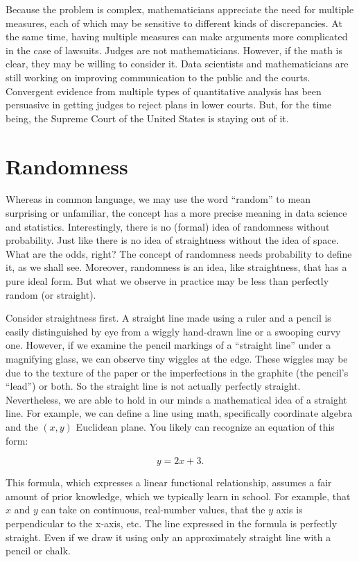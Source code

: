 \documentclass[
  openany]{book}
\begin{document}
Because the problem is complex, mathematicians appreciate the need for multiple measures, each of which may be sensitive to different kinds of discrepancies. At the same time, having multiple measures can make arguments more complicated in the case of lawsuits. Judges are not mathematicians. However, if the math is clear, they may be willing to consider it. Data scientists and mathematicians are still working on improving communication to the public and the courts. Convergent evidence from multiple types of quantitative analysis has been persuasive in getting judges to reject plans in lower courts. But, for the time being, the Supreme Court of the United States is staying out of it.

\hypertarget{appendix-appendix}{%
\appendix}


\hypertarget{sec:randomness}{%
\chapter{Randomness}\label{sec:randomness}}

Whereas in common language, we may use the word ``random'' to mean surprising or unfamiliar, the concept has a more precise meaning in data science and statistics. Interestingly, there is no (formal) idea of randomness without probability. Just like there is no idea of straightness without the idea of space. What are the odds, right? The concept of randomness needs probability to define it, as we shall see. Moreover, randomness is an idea, like straightness, that has a pure ideal form. But what we observe in practice may be less than perfectly random (or straight).

Consider straightness first. A straight line made using a ruler and a pencil is easily distinguished by eye from a wiggly hand-drawn line or a swooping curvy one. However, if we examine the pencil markings of a ``straight line'' under a magnifying glass, we can observe tiny wiggles at the edge. These wiggles may be due to the texture of the paper or the imperfections in the graphite (the pencil's ``lead'') or both. So the straight line is not actually perfectly straight. Nevertheless, we are able to hold in our minds a mathematical idea of a straight line. For example, we can define a line using math, specifically coordinate algebra and the \((x,y)\) Euclidean plane. You likely can recognize an equation of this form:

\[ y = 2 x + 3.\]

This formula, which expresses a linear functional relationship, assumes a fair amount of prior knowledge, which we typically learn in school. For example, that \(x\) and \(y\) can take on continuous, real-number values, that the \(y\) axis is perpendicular to the x-axis, etc. The line expressed in the formula is perfectly straight. Even if we draw it using only an approximately straight line with a pencil or chalk.
\end{document}
